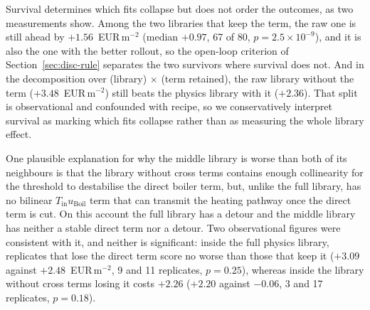 Survival determines which fits collapse but does not order the outcomes, as two
measurements show.
Among the two libraries that keep the term, the raw one is still ahead by
$+1.56$~EUR\,m$^{-2}$ (median $+0.97$, 67 of 80, $p=2.5\times10^{-9}$), and it is
also the one with the better rollout, so the open-loop criterion of
Section~\ref{sec:disc-rule} separates the two survivors where survival does not.
And in the decomposition over (library) $\times$ (term retained), the raw library
without the term ($+3.48$~EUR\,m$^{-2}$) still beats the physics library
with it ($+2.36$).
That split is observational and confounded with recipe, so we conservatively interpret
survival as marking which fits collapse rather than as measuring the whole library
effect.

One plausible explanation for why the middle library is worse than both of its
neighbours is that the library without cross terms contains enough collinearity for
the threshold to destabilise the direct boiler term, but, unlike the full library, has
no bilinear $T_{\text{in}}u_{\text{Boil}}$ term that can transmit the heating pathway
once the direct term is cut. On this account the full library has a detour and the
middle library has neither a stable direct term nor a detour. Two
observational figures were consistent with it, and neither is significant: inside
the full physics library, replicates that lose the direct term score no worse than
those that keep it ($+3.09$ against $+2.48$~EUR\,m$^{-2}$, 9 and 11 replicates,
$p=0.25$), whereas inside the library without cross terms losing it costs
$+2.26$ ($+2.20$ against $-0.06$, 3 and 17 replicates, $p=0.18$).

